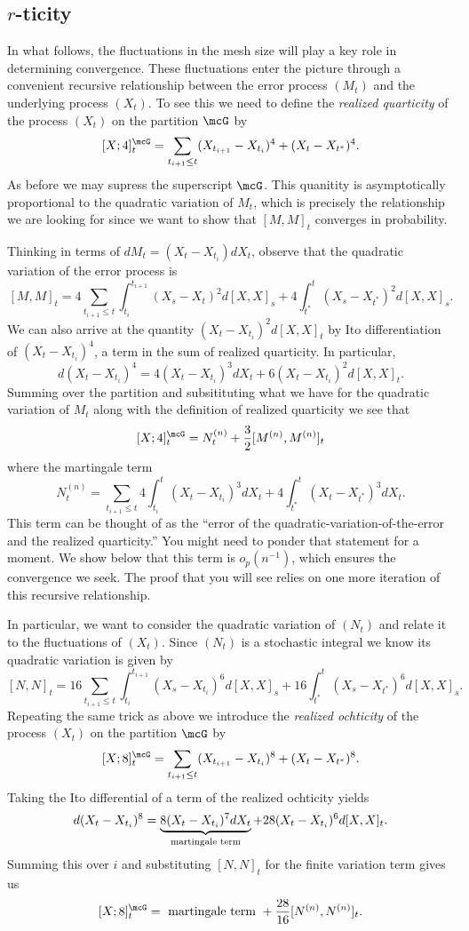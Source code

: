 \documentclass{report}
\begin{document}
\subsection{$r$-ticity}

In what follows, the fluctuations in the mesh size will play a key
role in determining convergence.  These fluctuations enter the picture
through a convenient recursive relationship between the error process
$(M_t)$ and the underlying process $(X_t)$.  To see this we need to
define the \emph{realized quarticity} of the process $(X_t)$ on the
partition $\mcG$ by
\[
[X;4]_t^\mcG = \sum_{t_{i+1} \leq t} (X_{t_{i+1}} - X_{t_i})^4 + (X_t
- X_{t^*})^4.
\]
As before we may supress the superscript $\mcG$.  This quanitity is
asymptotically proportional to the quadratic variation of $M_t$, which
is precisely the relationship we are looking for since we want to show
that $[M,M]_t$ converges in probability.

Thinking in terms of $dM_t = (X_t - X_{t_i}) dX_t$, observe that the
quadratic variation of the error process is
\[
[M,M]_t = 4 \sum_{t_{i+1} \leq t} \int_{t_i}^{t_{i+1}} (X_s - X_t)^2
d[X,X]_s + 4 \int_{t^*}^t (X_s - X_{t^*})^2 d[X,X]_s.
\]
We can also arrive at the quantity $(X_t - X_{t_i})^2 d[X,X]_t$ by Ito
differentiation of $(X_t - X_{t_i})^4$, a term in the sum of realized
quarticity.  In particular,
\[
d (X_t - X_{t_i})^4 = 4(X_t - X_{t_i})^3 dX_t + 6 (X_t - X_{t_i})^2
d[X,X]_t.
\]
Summing over the partition and subsitituting what we have for the
quadratic variation of $M_t$ along with the definition of realized
quarticity we see that
\[
[X;4]^\mcG_t = N^{(n)}_t + \frac{3}{2} [M^{(n)},M^{(n)}]_t
\]
where the martingale term
\[
N^{(n)}_t =
\sum_{t_{i+1} \leq t} 4 \int_{t_i}^t (X_t - X_{t_i})^3 dX_t +  4
\int_{t^*}^t (X_t - X_{t^*})^3 dX_t.
\]
This term can be thought of as the ``error of the
quadratic-variation-of-the-error and the realized quarticity.''  You
might need to ponder that statement for a moment.  We show below that
this term is $o_p(n^{-1})$, which ensures the convergence we seek. 
The proof that you will see relies on one more iteration of this
recursive relationship.

In particular, we want to consider the quadratic variation of $(N_t)$
and relate it to the fluctuations of $(X_t)$.  Since $(N_t)$ is a
stochastic integral we know its quadratic variation is given by
\[
[N,N]_t = 16 \sum_{t_{i+1} \leq t} \int_{t_i}^{t_{i+1}} (X_s -
X_{t_i})^6 d[X,X]_s + 16 \int_{t^*}^{t} (X_s - X_{t^*})^6 d[X,X]_s.
\]
Repeating the same trick as above we introduce the \emph{realized
ochticity} of the process $(X_t)$ on the partition $\mcG$ by
\[
[X;8]^\mcG_t = \sum_{t_{i+1} \leq t} (X_{t_{i+1}} - X_{t_i})^8 + (X_t
- X_{t^*})^8.
\]
Taking the Ito differential of a term of the realized ochticity yields
\[
d(X_t - X_{t_i})^8 = \underbrace{8 (X_t - X_{t_i})^7
dX_t}_{\textmd{martingale term}} + 28 (X_t - X_{t_i})^6 d[X,X]_t.
\]
Summing this over $i$ and substituting $[N,N]_t$ for the finite
variation term gives us 
\[
[X;8]^\mcG_t = \textmd{ martingale term } + \frac{28}{16}
[N^{(n)},N^{(n)}]_t.
\]
\end{document}
